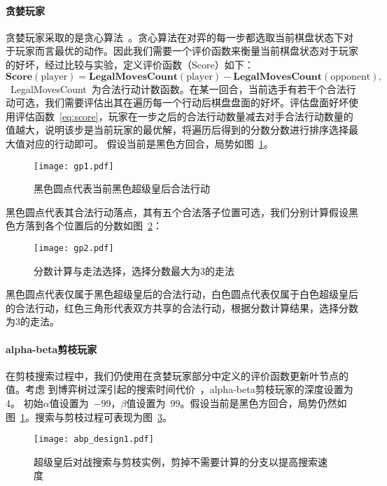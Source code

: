 \paragraph{贪婪玩家}
贪婪玩家采取的是贪心算法~\cite{introAlgo}。贪心算法在对弈的每一步都选取当前棋盘状态下对于玩家而言最优的动作。因此我们需要一个评价函数来衡量当前棋盘状态对于玩家的好坏，经过比较与实验，定义评价函数（Score）如下：
\begin{equation}
    \textbf{Score}(\text{player}) = \textbf{LegalMovesCount}(\text{player}) - \textbf{LegalMovesCount}(\text{opponent}),
    \label{eq:score}
\end{equation}
~LegalMovesCount~为合法行动计数函数。在某一回合，当前选手有若干个合法行动可选，我们需要评估出其在遍历每一个行动后棋盘盘面的好坏。评估盘面好坏使用评估函数~\eqref{eq:score}，玩家在一步之后的合法行动数量减去对手合法行动数量的值越大，说明该步是当前玩家的最优解，将遍历后得到的分数分数进行排序选择最大值对应的行动即可。
假设当前是黑色方回合，局势如图~\ref{fig:gp1}。
\begin{figure}[htb]
    \centering
    \texttt{[image: gp1.pdf]}
    \caption[gp1]{%
        黑色圆点代表当前黑色超级皇后合法行动%
      }
    \label{fig:gp1}
\end{figure}
黑色圆点代表其合法行动落点，其有五个合法落子位置可选，我们分别计算假设黑色方落到各个位置后的分数如图~\ref{fig:gp2}：
\begin{figure}[htb]
    \centering
    \texttt{[image: gp2.pdf]}
    \caption[gp2]{%
        分数计算与走法选择，选择分数最大为3的走法%
      }
    \label{fig:gp2}
\end{figure}
黑色圆点代表仅属于黑色超级皇后的合法行动，白色圆点代表仅属于白色超级皇后的合法行动，红色三角形代表双方共享的合法行动，根据分数计算结果，选择分数为3的走法。
\paragraph{alpha-beta剪枝玩家}
在剪枝搜索过程中，我们仍使用在贪婪玩家部分中定义的评价函数更新叶节点的值。考虑
到博弈树过深引起的搜索时间代价~\cite{sstextbook}，alpha-beta剪枝玩家的深度设置为4。
初始$\alpha$值设置为~$-99$，$\beta$值设置为~$99$。假设当前是黑色方回合，局势仍然如图~\ref{fig:gp1}。搜索与剪枝过程可表现为图~\ref{fig:abpde}。
\begin{figure}[htb]
    \centering
    \texttt{[image: abp\_design1.pdf]}
    \caption[abpde]{%
        超级皇后对战搜索与剪枝实例，剪掉不需要计算的分支以提高搜索速度%
      }
    \label{fig:abpde}
\end{figure}

